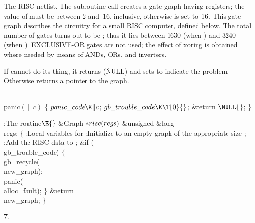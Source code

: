 The RISC netlist. The subroutine call  creates a
gate graph having  registers; the value of  must be
between 2 and~16, inclusive, otherwise  is set to~16.
This gate graph describes the circuitry for a small RISC computer, defined
below. The total number of gates turns out to be ;
thus it lies between 1630 (when ) and 3240 (when ).
{\sc EXCLUSIVE-OR} gates are not used; the effect of xoring is obtained where
needed by means of {\sc AND}s, {\sc OR}s, and inverters.

If  cannot do its thing, it returns \PB{$\NULL$} (\.{NULL})
and sets 
to indicate the problem. Otherwise  returns a pointer to the
graph.

\Y\B\4\D\\{panic}$(\|c)$\5
${}\{{}$\5
\1${}\\{panic\_code}\K\|c{}$;\5
${}\\{gb\_trouble\_code}\K\T{0}{}$;\5
\&{return} ${}\NULL{}$;\5
${}\}{}$\2\par
\Y\B\4:The  routine\X${}\E{}$\6
\1\1\&{Graph} ${}{*}\\{risc}(\\{regs}){}$\6
\&{unsigned} \&{long} \\{regs};\2\2\6
${}\{{}$\5
\1:Local variables for \X\7
:Initialize  to an empty graph of the appropriate size%
\X;\6
:Add the RISC data to \X;\6
\&{if} (\\{gb\_trouble\_code})\5
${}\{{}$\1\6
\\{gb\_recycle}(\\{new\_graph});\6
\\{panic}(\\{alloc\_fault});\6
\4${}\}{}$\2\6
\&{return} \\{new\_graph};\6
\4${}\}{}$\2\par
\U7.\fi

